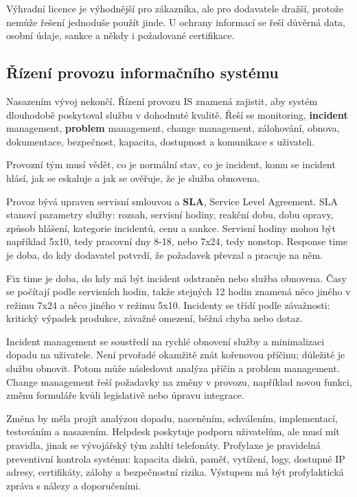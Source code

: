 \documentclass[11pt,a4paper]{article}
\begin{document}
Výhradní licence je výhodnější pro zákazníka, ale pro dodavatele dražší, protože nemůže řešení jednoduše použít jinde. U ochrany informací se řeší důvěrná data, osobní údaje, sankce a někdy i požadované certifikace.

\subsection*{Řízení provozu informačního systému}

Nasazením vývoj nekončí. Řízení provozu IS znamená zajistit, aby systém dlouhodobě poskytoval službu v dohodnuté kvalitě. Řeší se monitoring, \textbf{incident} management, \textbf{problem} management, change management, zálohování, obnova, dokumentace, bezpečnost, kapacita, dostupnost a komunikace s uživateli.

Provozní tým musí vědět, co je normální stav, co je incident, komu se incident hlásí, jak se eskaluje a jak se ověřuje, že je služba obnovena.

Provoz bývá upraven servisní smlouvou a \textbf{SLA}, Service Level Agreement. SLA stanoví parametry služby: rozsah, servisní hodiny, reakční dobu, dobu opravy, způsob hlášení, kategorie incidentů, cenu a sankce. Servisní hodiny mohou být například 5x10, tedy pracovní dny 8-18, nebo 7x24, tedy nonstop. Response time je doba, do kdy dodavatel potvrdí, že požadavek převzal a pracuje na něm.

Fix time je doba, do kdy má být incident odstraněn nebo služba obnovena. Časy se počítají podle servisních hodin, takže stejných 12 hodin znamená něco jiného v režimu 7x24 a něco jiného v režimu 5x10. Incidenty se třídí podle závažnosti: kritický výpadek produkce, závažné omezení, běžná chyba nebo dotaz.

Incident management se soustředí na rychlé obnovení služby a minimalizaci dopadu na uživatele. Není prvořadé okamžitě znát kořenovou příčinu; důležité je službu obnovit. Potom může následovat analýza příčin a problem management. Change management řeší požadavky na změny v provozu, například novou funkci, změnu formuláře kvůli legislativě nebo úpravu integrace.

Změna by měla projít analýzou dopadu, naceněním, schválením, implementací, testováním a nasazením. Helpdesk poskytuje podporu uživatelům, ale musí mít pravidla, jinak se vývojářský tým zahltí telefonáty. Profylaxe je pravidelná preventivní kontrola systému: kapacita disků, paměť, vytížení, logy, dostupné IP adresy, certifikáty, zálohy a bezpečnostní rizika. Výstupem má být profylaktická zpráva s nálezy a doporučeními.
\end{document}
